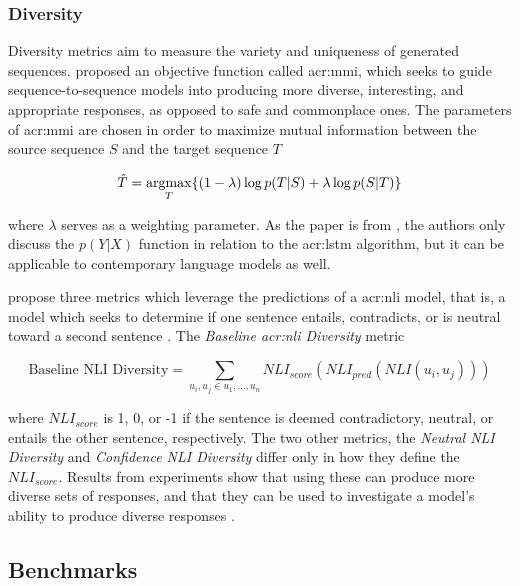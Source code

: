 \subsubsection{Diversity}

Diversity metrics aim to measure the variety and uniqueness of generated sequences. \cite{liDiversityPromotingObjectiveFunction2016} proposed an objective function called \gls{acr:mmi}, which seeks to guide sequence-to-sequence models into producing more diverse, interesting, and appropriate responses, as opposed to safe and commonplace ones. The parameters of \gls{acr:mmi} are chosen in order to maximize mutual information between the source sequence $S$ and the target sequence $T$

\begin{equation}
    \hat{T} = \operatorname*{argmax}_{T} \{ (1 - \lambda) \log p(T|S) + \lambda \log p(S|T) \}
\end{equation}

\noindent where $\lambda$ serves as a weighting parameter. As the paper is from \citeyear{liDiversityPromotingObjectiveFunction2016}, the authors only discuss the $p(Y|X)$ function in relation to the \gls{acr:lstm} algorithm, but it can be applicable to contemporary language models as well.

\cite{stasaskiSemanticDiversityDialogue2022} propose three metrics which leverage the predictions of a \gls{acr:nli} model, that is, a model which seeks to determine if one sentence entails, contradicts, or is neutral toward a second  sentence \citep[1]{stasaskiSemanticDiversityDialogue2022}. The \textit{Baseline \acrshort{acr:nli} Diversity} metric

\begin{equation}
    \text{Baseline NLI Diversity} = \sum_{u_i,u_j \in u_1,...,u_n} NLI_{score}(NLI_{pred}(NLI(u_i, u_j)))
\end{equation}

where $NLI_{score}$ is 1, 0, or -1 if the sentence is deemed contradictory, neutral, or entails the other sentence, respectively. The two other metrics, the \textit{Neutral NLI Diversity} and \textit{Confidence NLI Diversity} differ only in how they define the $NLI_{score}$. Results from experiments show that using these can produce more diverse sets of responses, and that they can be used to investigate a model's ability to produce diverse responses \citep[9]{stasaskiSemanticDiversityDialogue2022}.

\subsection{Benchmarks}\label{subsec:benchmarks}

